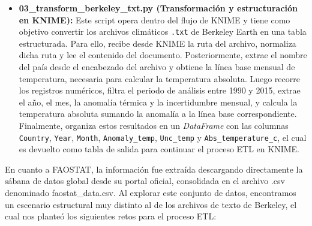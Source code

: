 \begin{itemize}
	\item \textbf{03\_transform\_berkeley\_txt.py (Transformación y estructuración en KNIME): } Este script opera dentro del flujo de KNIME y tiene como objetivo convertir los archivos climáticos \texttt{.txt} de Berkeley Earth en una tabla estructurada. Para ello, recibe desde KNIME la ruta del archivo, normaliza dicha ruta y lee el contenido del documento. Posteriormente, extrae el nombre del país desde el encabezado del archivo y obtiene la línea base mensual de temperatura, necesaria para calcular la temperatura absoluta. Luego recorre los registros numéricos, filtra el periodo de análisis entre 1990 y 2015, extrae el año, el mes, la anomalía térmica y la incertidumbre mensual, y calcula la temperatura absoluta sumando la anomalía a la línea base correspondiente. Finalmente, organiza estos resultados en un \textit{DataFrame} con las columnas \texttt{Country}, \texttt{Year}, \texttt{Month}, \texttt{Anomaly\_temp}, \texttt{Unc\_temp} y \texttt{Abs\_temperature\_c}, el cual es devuelto como tabla de salida para continuar el proceso ETL en KNIME.
\end{itemize}
En cuanto a FAOSTAT, la información fue extraída descargando directamente la sábana de datos global desde su portal oficial, consolidada en el archivo .csv denominado faostat\_data.csv. Al explorar este conjunto de datos, encontramos un escenario estructural muy distinto al de los archivos de texto de Berkeley, el cual nos planteó los siguientes retos para el proceso ETL: 

